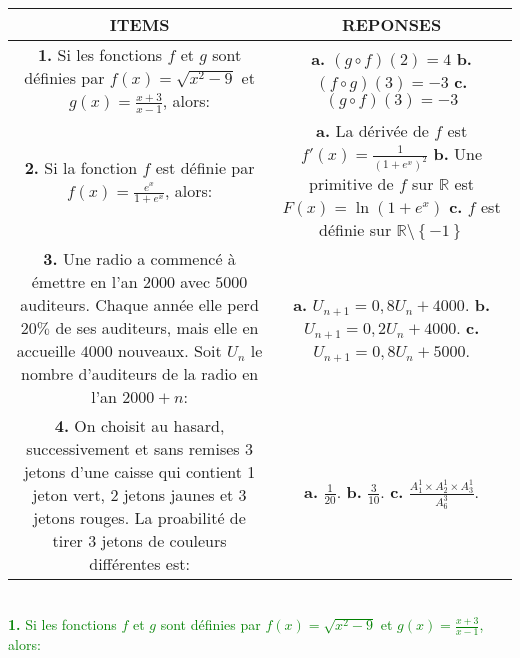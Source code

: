 \documentclass[12pt]{article}
\begin{document}
\begin{tabular}{|c|c|}
\hline
\textbf{ITEMS} & \textbf{REPONSES}\\
\hline
\makecell[l]{\textbf{1.} Si les fonctions $f$ et $g$ sont définies par \\ $f(x)=\sqrt{x^{2}-9}$ et $g(x)=\frac{x+3}{x-1}$, alors:} &
\makecell[l]{\textbf{a.} $(g\circ f)(2)=4$ \\ \textbf{b.} $(f\circ g)(3)=-3$ \\ \textbf{c.} $(g\circ f)(3)=-3$}\\
\hline
\makecell[l]{\textbf{2.} Si la fonction $f$ est définie par \\ $f(x)=\frac{e^{x}}{1+e^{x}}$, alors:} &
\makecell[l]{\textbf{a.} La dérivée de $f$ est $f'(x)=\frac{1}{\left(1+e^{x}\right)^{2}}$ \\ \textbf{b.} Une primitive de $f$ sur $\mathbb{R}$ est\\ $F(x)=\ln(1+e^{x})$ \\ \textbf{c.} $f$ est définie sur $\mathbb{R}\setminus\left\lbrace -1\right\rbrace $}\\ 
\hline
\makecell[l]{\textbf{3.} Une radio a commencé à émettre en l'an $2000$\\ avec $5000$ auditeurs. Chaque année elle perd \\ $20\%$ de ses auditeurs, mais elle en accueille $4000$\\ nouveaux. Soit $U_{n}$ le nombre d'auditeurs de la\\ radio en  l'an $2000+n$: } & \makecell[l]{\textbf{a.} $U_{n+1}=0,8U_{n}+4000$. \\ 
\textbf{b.} $U_{n+1}=0,2U_{n}+4000$. \\ \textbf{c.} $U_{n+1}=0,8U_{n}+5000$. }\\
\hline
\makecell[l]{\textbf{4.} On choisit au hasard, successivement et sans\\ remises $3$ jetons d'une caisse qui contient 1 jeton\\ vert, 2 jetons jaunes et 3 jetons rouges.\\ La proabilité de tirer 3 jetons de couleurs différentes est:} & 
\makecell[l]{\textbf{a.} $\frac{1}{20}$. \\ 
\textbf{b.} $\frac{3}{10}$. \\ \textbf{c.} $\frac{ A_{1}^{1}\times A_{2}^{1}\times A_{3}^{1}}{ A_{6}^{3} }$. }\\
\hline
\end{tabular}\\

\textcolor{green}{\textbf{1.} Si les fonctions $f$ et $g$ sont définies par  $f(x)=\sqrt{x^{2}-9}$ et $g(x)=\frac{x+3}{x-1}$, alors:}
\end{document}
